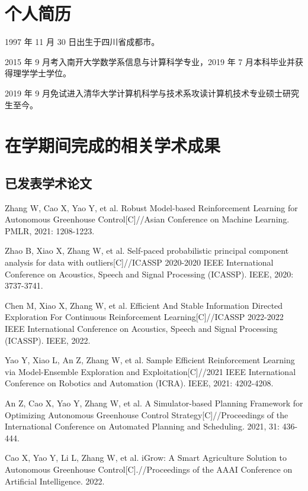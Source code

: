 
\begin{resume}

  \section*{个人简历}

  1997 年 11 月 30 日出生于四川省成都市。

  2015 年 9 月考入南开大学数学系信息与计算科学专业，2019 年 7 月本科毕业并获得理学学士学位。

  2019 年 9 月免试进入清华大学计算机科学与技术系攻读计算机技术专业硕士研究生至今。


  \section*{在学期间完成的相关学术成果}

  \subsection*{已发表学术论文}

  \begin{achievements}
    \item Zhang W, Cao X, Yao Y, et al. Robust Model-based Reinforcement Learning for Autonomous Greenhouse Control[C]//Asian Conference on Machine Learning. PMLR, 2021: 1208-1223.
    \item Zhao B, Xiao X, Zhang W, et al. Self-paced probabilistic principal component analysis for data with outliers[C]//ICASSP 2020-2020 IEEE International Conference on Acoustics, Speech and Signal Processing (ICASSP). IEEE, 2020: 3737-3741.
    \item Chen M, Xiao X, Zhang W, et al. Efficient And Stable Information Directed Exploration For Continuous Reinforcement Learning[C]//ICASSP 2022-2022 IEEE International Conference on Acoustics, Speech and Signal Processing (ICASSP). IEEE, 2022.
    \item Yao Y, Xiao L, An Z, Zhang W, et al. Sample Efficient Reinforcement Learning via Model-Ensemble Exploration and Exploitation[C]//2021 IEEE International Conference on Robotics and Automation (ICRA). IEEE, 2021: 4202-4208.
    \item An Z, Cao X, Yao Y, Zhang W, et al. A Simulator-based Planning Framework for Optimizing Autonomous Greenhouse Control Strategy[C]//Proceedings of the International Conference on Automated Planning and Scheduling. 2021, 31: 436-444.
    \item Cao X, Yao Y, Li L, Zhang W, et al. iGrow: A Smart Agriculture Solution to Autonomous Greenhouse Control[C].//Proceedings of the AAAI Conference on Artificial Intelligence. 2022.
  \end{achievements}
  

\end{resume}
